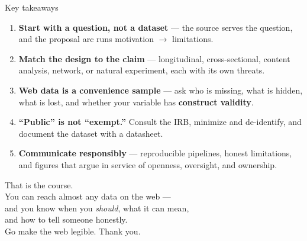 \documentclass[9pt,aspectratio=169]{beamer}
\begin{document}
\begin{frame}{Key takeaways}
    \begin{enumerate}
        \item \textbf{Start with a question, not a dataset} --- the source serves the question, and the proposal arc runs motivation $\to$ limitations.
        \item \textbf{Match the design to the claim} --- longitudinal, cross-sectional, content analysis, network, or natural experiment, each with its own threats.
        \item \textbf{Web data is a convenience sample} --- ask who is missing, what is hidden, what is lost, and whether your variable has \textbf{construct validity}.
        \item \textbf{``Public'' is not ``exempt.''} Consult the IRB, minimize and de-identify, and document the dataset with a datasheet.
        \item \textbf{Communicate responsibly} --- reproducible pipelines, honest limitations, and figures that argue in service of openness, oversight, and ownership.
    \end{enumerate}
    \vspace{0.8em}
\end{frame}

\begin{frame}[standout]
    That is the course.\\[0.6em]
    You can reach almost any data on the web ---\\
    and you know when you \textit{should}, what it can mean,\\
    and how to tell someone honestly.\\[1em]
    {\large Go make the web legible. Thank you.}
\end{frame}
\end{document}
